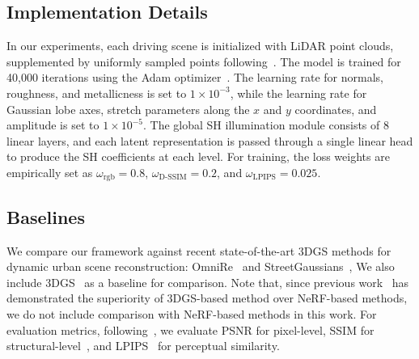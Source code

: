 \documentclass[letterpaper, 10 pt, conference]{ieeeconf}  %
\begin{document}
\subsection{Implementation Details}
In our experiments, each driving scene is initialized with LiDAR point clouds, supplemented by uniformly sampled points following~\cite{chen2023periodic}. The model is trained for 40,000 iterations using the Adam optimizer~\cite{kingma2014adam}. The learning rate for normals, roughness, and metallicness is set to $1\times 10^{-3}$, while the learning rate for Gaussian lobe axes, stretch parameters along the $x$ and $y$ coordinates, and amplitude is set to $1\times 10^{-5}$. The global SH illumination module consists of 8 linear layers, and each latent representation is passed through a single linear head to produce the SH coefficients at each level. For training, the loss weights are empirically set as $\omega_\text{rgb}=0.8$, $\omega_\text{D-SSIM}=0.2$, and $\omega_\text{LPIPS}=0.025$.   


\subsection{Baselines}
We compare our framework against recent state-of-the-art 3DGS methods for dynamic urban scene reconstruction: OmniRe~\cite{chen2025omnire} and StreetGaussians~\cite{yan2024street}, We also include 3DGS~\cite{kerbl20233d} as a baseline for comparison.
Note that, since previous work~\cite{chen2025omnire,yan2024street} has demonstrated the superiority of 3DGS-based method over NeRF-based methods, we do not include comparison with NeRF-based methods in this work.
%
For evaluation metrics, following~\cite{chen2025omnire,yan2024street}, we evaluate PSNR for pixel-level, SSIM for structural-level~\cite{zhang2018unreasonable}, and LPIPS~\cite{wang2004image} for perceptual similarity.
\end{document}
